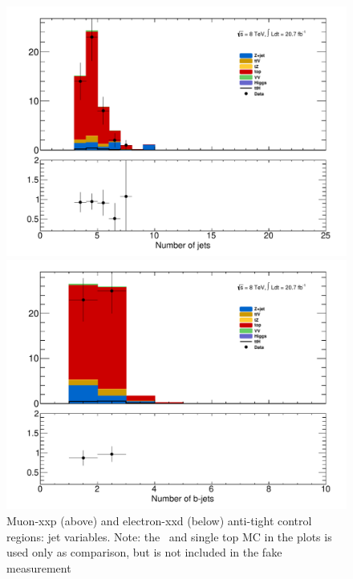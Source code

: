 \begin{figure}[!htbp]
\begin{minipage}[h]{0.5\textwidth}
    \centering \includegraphics[width=\textwidth]{figs/fake/cr_d1_NJet}
  \end{minipage}\hfill
  \begin{minipage}[h]{0.5\textwidth}
    \centering \includegraphics[width=\textwidth]{figs/fake/cr_d1_NJetBTag}
  \end{minipage}\hfill

  
  \caption{Muon-xxp (above) and electron-xxd (below) anti-tight control regions: jet variables. Note: the \ttbar\ and single top MC in the plots is used only as comparison, but is not included
  in the fake measurement}
  \label{figure:background_3lcr}
  \end{figure} 


